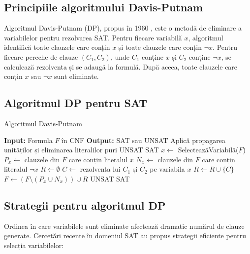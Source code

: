 \documentclass[a4paper,10pt]{article}
\begin{document}
\subsection{Principiile algoritmului Davis-Putnam}

Algoritmul Davis-Putnam (DP), propus în 1960 \cite{DavisPutnam1960}, este o metodă de eliminare a variabilelor pentru rezolvarea SAT. Pentru fiecare variabilă $x$, algoritmul identifică toate clauzele care conțin $x$ și toate clauzele care conțin $\neg x$. Pentru fiecare pereche de clauze $(C_1, C_2)$, unde $C_1$ conține $x$ și $C_2$ conține $\neg x$, se calculează rezolventa și se adaugă la formulă. După aceea, toate clauzele care conțin $x$ sau $\neg x$ sunt eliminate.

\subsection{Algoritmul DP pentru SAT}

\begin{algorithm}
\caption{Algoritmul Davis-Putnam}
\begin{algorithmic}[1]
\State \textbf{Input:} Formula $F$ în CNF
\State \textbf{Output:} SAT sau UNSAT
    \State Aplică propagarea unităților și eliminarea literalilor puri
        \Return UNSAT
    \EndIf
        \Return SAT
    \EndIf
    \State $x \gets$ SelecteazăVariabilă($F$)
    \State $P_x \gets$ clauzele din $F$ care conțin literalul $x$
    \State $N_x \gets$ clauzele din $F$ care conțin literalul $\neg x$
    \State $R \gets \emptyset$
        \State $C \gets$ rezolventa lui $C_1$ și $C_2$ pe variabila $x$
            \State $R \gets R \cup \{C\}$
        \EndIf
    \EndFor
    \State $F \gets (F \setminus (P_x \cup N_x)) \cup R$
\EndWhile
{}
    \Return UNSAT
\Else
    \Return SAT
\EndIf
\end{algorithmic}
\end{algorithm}

\subsection{Strategii pentru algoritmul DP}

Ordinea în care variabilele sunt eliminate afectează dramatic numărul de clauze generate. Cercetări recente în domeniul SAT \cite{Een2019} au propus strategii eficiente pentru selecția variabilelor:
\end{document}

